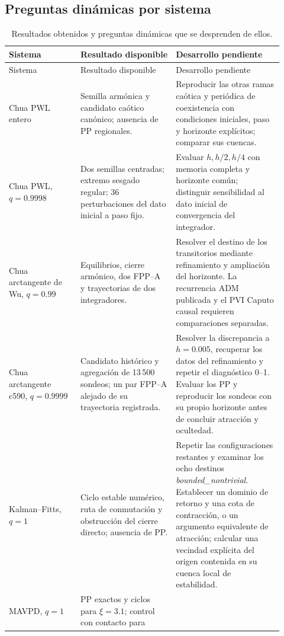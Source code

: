 \subsection{Preguntas dinámicas por sistema}

\begin{longtable}{@{}L{0.24\linewidth}L{0.32\linewidth}L{0.36\linewidth}@{}}
\caption{Resultados obtenidos y preguntas dinámicas que se desprenden de ellos.}
\label{tab:procedimientos-pendientes}\\
\toprule
Sistema & Resultado disponible & Desarrollo pendiente\\
\midrule
\endfirsthead
\toprule
Sistema & Resultado disponible & Desarrollo pendiente\\
\midrule
\endhead
Chua PWL entero
& Semilla armónica y candidato caótico canónico; ausencia de PP regionales.
& Reproducir las otras ramas caótica y periódica de coexistencia con
condiciones iniciales, paso y horizonte explícitos; comparar sus cuencas.\\
Chua PWL, \(q=0.9998\)
& Dos semillas centradas; extremo sesgado regular; 36 perturbaciones del dato
inicial a paso fijo.
& Evaluar \(h,h/2,h/4\) con memoria completa y horizonte común; distinguir
sensibilidad al dato inicial de convergencia del integrador.\\
Chua arctangente de Wu, \(q=0.99\)
& Equilibrios, cierre armónico, dos FPP--A y trayectorias de dos integradores.
& Resolver el destino de los transitorios mediante refinamiento y ampliación
del horizonte. La recurrencia ADM publicada y el PVI Caputo causal requieren
comparaciones separadas.\\
Chua arctangente c590, \(q=0.9999\)
& Candidato histórico y agregación de 13\,500 sondeos; un par FPP--A alejado
de su trayectoria registrada.
& Resolver la discrepancia a \(h=0.005\), recuperar los datos del
refinamiento y repetir el diagnóstico 0--1. Evaluar los PP y reproducir los
sondeos con su propio horizonte antes de concluir atracción y ocultedad.\\
Kalman--Fitts, \(q=1\)
& Ciclo estable numérico, ruta de conmutación y obstrucción del cierre directo;
ausencia de PP.
& Repetir las configuraciones restantes y examinar los ocho destinos
\emph{bounded\_nontrivial}. Establecer un dominio de retorno y una cota de contracción, o un argumento
equivalente de atracción; calcular una vecindad explícita del origen contenida
en su cuenca local de estabilidad.\\
MAVPD, \(q=1\)
& PP exactos y ciclos para \(\xi=3.1\); control con contacto para

\end{longtable}
